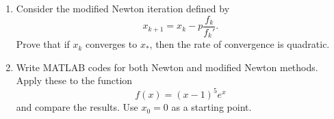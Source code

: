 \documentclass[a4paper,12pt]{article}
\begin{document}
\begin{enumerate}[label = \arabic*.]
\begin{enumerate}[label = \roman*.]
			\item Consider the modified Newton iteration defined by 
			\[
				x_{k+1} = x_k - p \frac{f_k}{f_k'}.
			\]
			Prove that if $ x_k $ converges to $ x_* $, then the rate of convergence is quadratic.
				
			\item Write MATLAB codes for both Newton and modified Newton methods. Apply these to the function
			\[
				f(x) = (x-1)^5 e^x
			\]
			and compare the results. Use $ x_0 = 0 $ as a starting point.
		\end{enumerate}
	\end{enumerate}
\end{document}
